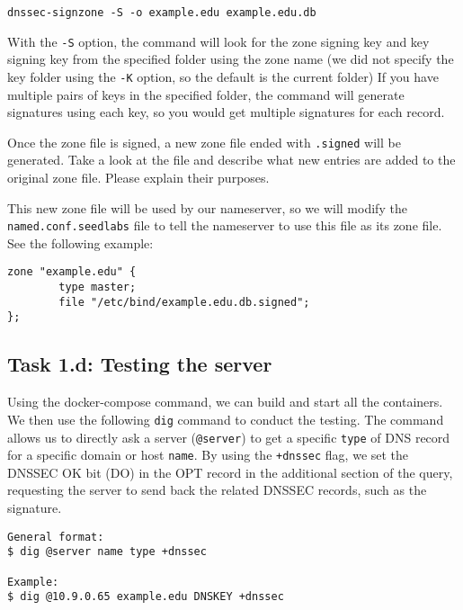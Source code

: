 \begin{lstlisting}
dnssec-signzone -S -o example.edu example.edu.db
\end{lstlisting}
 
With the \texttt{-S} option, the command will look
for the zone signing key and key signing key 
from the specified folder using the zone name (we did not specify the key folder 
using the \texttt{-K} option, so the default is the current folder)
If you have multiple pairs of keys in the specified folder,
the command will generate signatures using each key, so you would get 
multiple signatures for each record. 


Once the zone file is signed, a new zone file ended with
\texttt{.signed} will be generated. Take a look at the file and describe 
what new entries are added to the original zone file. Please explain
their purposes. 


This new zone file will be used by our nameserver, so 
we will modify the \texttt{named.conf.seedlabs} file to tell the 
nameserver to use this file as its zone file. See the following 
example: 

\begin{lstlisting}
zone "example.edu" {
        type master;
        file "/etc/bind/example.edu.db.signed";
};
\end{lstlisting}


\subsection{Task 1.d: Testing the server}

Using the docker-compose command, we can build and start all the 
containers. We then use the following \texttt{dig} command to conduct the testing. 
The command allows us to directly ask 
a server (\texttt{@server}) to get a specific \texttt{type}
of DNS record for a specific domain or host \texttt{name}.
By using the \texttt{+dnssec} flag, we set the DNSSEC OK bit (DO) in the OPT record 
in the additional section of the query, requesting the server to
send back the related DNSSEC records, such as the signature. 

\begin{lstlisting}
General format:
$ dig @server name type +dnssec

Example:
$ dig @10.9.0.65 example.edu DNSKEY +dnssec
\end{lstlisting}
 

